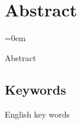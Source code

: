 \newpage
\chapter*{Abstract}
\parindent=0em

Abstract





\section*{Keywords}

English key words


